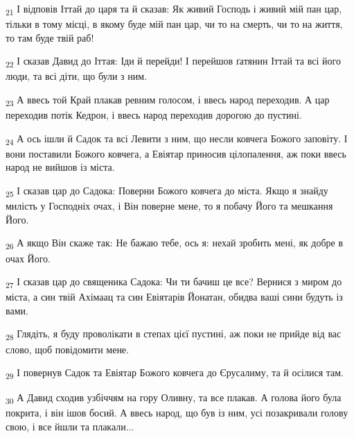 \begin{tcolorbox}
\textsubscript{21} І відповів Іттай до царя та й сказав: Як живий Господь і живий мій пан цар, тільки в тому місці, в якому буде мій пан цар, чи то на смерть, чи то на життя, то там буде твій раб!
\end{tcolorbox}
\begin{tcolorbox}
\textsubscript{22} І сказав Давид до Іттая: Іди й перейди! І перейшов ґатянин Іттай та всі його люди, та всі діти, що були з ним.
\end{tcolorbox}
\begin{tcolorbox}
\textsubscript{23} А ввесь той Край плакав ревним голосом, і ввесь народ переходив. А цар переходив потік Кедрон, і ввесь народ переходив дорогою до пустині.
\end{tcolorbox}
\begin{tcolorbox}
\textsubscript{24} А ось ішли й Садок та всі Левити з ним, що несли ковчега Божого заповіту. І вони поставили Божого ковчега, а Евіятар приносив цілопалення, аж поки ввесь народ не вийшов із міста.
\end{tcolorbox}
\begin{tcolorbox}
\textsubscript{25} І сказав цар до Садока: Поверни Божого ковчега до міста. Якщо я знайду милість у Господніх очах, і Він поверне мене, то я побачу Його та мешкання Його.
\end{tcolorbox}
\begin{tcolorbox}
\textsubscript{26} А якщо Він скаже так: Не бажаю тебе, ось я: нехай зробить мені, як добре в очах Його.
\end{tcolorbox}
\begin{tcolorbox}
\textsubscript{27} І сказав цар до священика Садока: Чи ти бачиш це все? Вернися з миром до міста, а син твій Ахімаац та син Евіятарів Йонатан, обидва ваші сини будуть із вами.
\end{tcolorbox}
\begin{tcolorbox}
\textsubscript{28} Глядіть, я буду проволікати в степах цієї пустині, аж поки не прийде від вас слово, щоб повідомити мене.
\end{tcolorbox}
\begin{tcolorbox}
\textsubscript{29} І повернув Садок та Евіятар Божого ковчега до Єрусалиму, та й осілися там.
\end{tcolorbox}
\begin{tcolorbox}
\textsubscript{30} А Давид сходив узбіччям на гору Оливну, та все плакав. А голова його була покрита, і він ішов босий. А ввесь народ, що був із ним, усі позакривали голову свою, і все йшли та плакали...
\end{tcolorbox}
